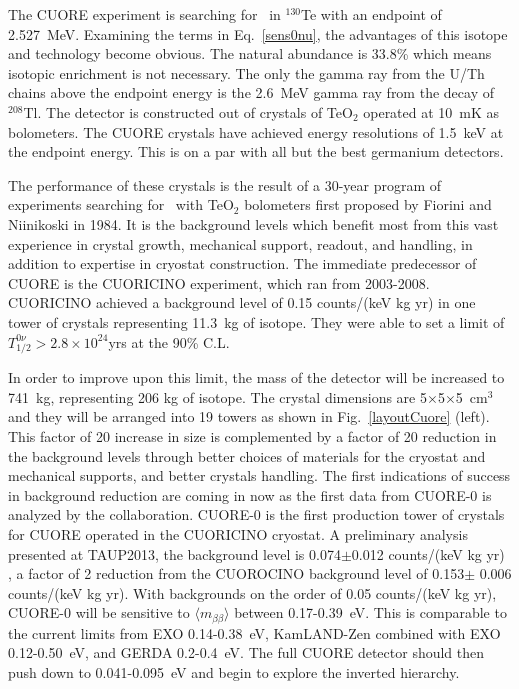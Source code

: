 The CUORE experiment is searching for \zeronu~in $^{130}$Te with an endpoint of 2.527~MeV. Examining the terms in Eq.~\ref{sens0nu}, the advantages of this isotope and technology become obvious. The natural abundance is 33.8\% which means isotopic enrichment is not necessary. The only the gamma ray from the U/Th chains above the endpoint energy is the 2.6~MeV gamma ray from the decay of $^{208}$Tl.  The detector is constructed out of crystals of TeO$_{2}$  operated at 10~mK as bolometers. The CUORE crystals have achieved energy resolutions of 1.5~keV at the endpoint energy. This is on a par with all but the best germanium detectors. 

The performance of these crystals is the result of a 30-year program of experiments searching for \zeronu~with TeO$_{2}$ bolometers first proposed by Fiorini and Niinikoski  in 1984\cite{Fiorini198483}. It is the background levels which benefit most from this vast experience in crystal growth, mechanical support, readout, and handling, in addition to expertise in cryostat construction. The immediate predecessor of CUORE is the CUORICINO experiment, which ran from 2003-2008.  CUORICINO achieved a background level of 0.15 counts/(keV kg yr) in one tower of crystals representing 11.3~kg of isotope. They were able to set a limit of $T_{1/2}^{0\nu} > 2.8\times10^{24}$yrs at the 90\% C.L.

In order to improve upon this limit, the mass of the detector will be increased to 741~kg, representing  206 kg of isotope. The crystal dimensions are 5$\times$5$\times$5~cm$^{3}$ and they will be arranged into 19 towers as shown in Fig.~\ref{layoutCuore} (left). This factor of 20 increase in size is complemented by a factor of 20 reduction in the background levels through better choices of materials for the cryostat and mechanical supports, and better crystals handling. The first indications of success in background reduction are coming in now as the first data from CUORE-0 is analyzed by the collaboration. CUORE-0 is the first production tower of crystals for CUORE operated in the CUORICINO cryostat. A preliminary analysis presented at TAUP2013, the background level is 0.074$\pm$0.012 counts/(keV kg yr) , a factor of 2 reduction from the CUOROCINO background level of 0.153$\pm$ 0.006 counts/(keV kg yr).  With backgrounds on the order of 0.05 counts/(keV kg yr), CUORE-0 will be sensitive to $\langle m_{\beta\beta} \rangle$ between 0.17-0.39~eV. This is comparable to the current limits from EXO 0.14-0.38~eV\cite{EXO2012}, KamLAND-Zen combined with EXO 0.12-0.50~eV\cite{KZ0nu}, and GERDA 0.2-0.4~eV\cite{gerda2013}.  The full CUORE detector should then push down to 0.041-0.095~eV and begin to explore the inverted hierarchy.

